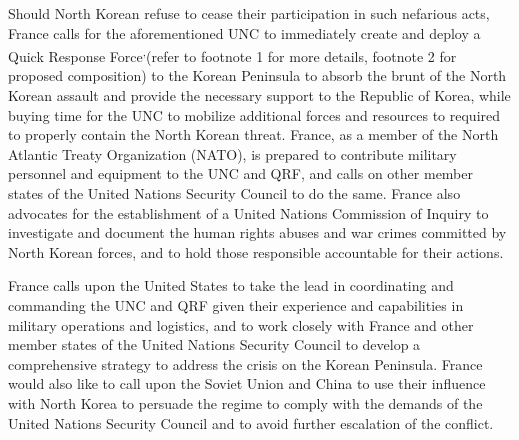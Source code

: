 \documentclass[a4paper,12pt]{article}
\begin{document}
Should North Korean refuse to cease their participation in such nefarious acts, France calls for the aforementioned UNC to immediately create and deploy a Quick Response Force\footnotemark[1]\textsuperscript{,}\footnotemark[2] (refer to footnote 1 for more details, footnote 2 for proposed composition) to the Korean Peninsula to absorb the brunt of the North Korean assault and provide the necessary support to the Republic of Korea, while buying time for the UNC to mobilize additional forces and resources to required to properly contain the North Korean threat. France, as a member of the North Atlantic Treaty Organization (NATO), is prepared to contribute military personnel and equipment to the UNC and QRF, and calls on other member states of the United Nations Security Council to do the same. France also advocates for the establishment of a United Nations Commission of Inquiry to investigate and document the human rights abuses and war crimes committed by North Korean forces, and to hold those responsible accountable for their actions.

France calls upon the United States to take the lead in coordinating and commanding the UNC and QRF given their experience and capabilities in military operations and logistics, and to work closely with France and other member states of the United Nations Security Council to develop a comprehensive strategy to address the crisis on the Korean Peninsula. France would also like to call upon the Soviet Union and China to use their influence with North Korea to persuade the regime to comply with the demands of the United Nations Security Council and to avoid further escalation of the conflict.

\newpage
\end{document}
